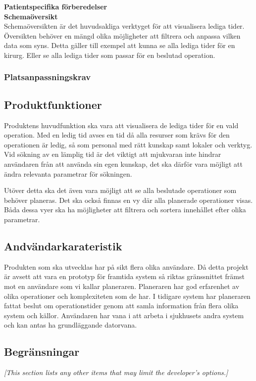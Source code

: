 \documentclass{article}
\begin{document}
\begin{enumerate}
\textbf{Patientspecifika förberedelser}\\
\textbf{Schemaöversikt}\\
Schemaöversikten är det huvudsakliga verktyget för att visualisera lediga tider.
Översikten behöver en mängd olika möjligheter att filtrera och anpassa vilken
data som syns. Detta gäller till exempel att kunna se alla lediga tider för en
kirurg. Eller se alla lediga tider som passar för en beslutad operation.\\


\subsubsection{Platsanpassningskrav}
\label{subsec:Platsanpassningskrav}
\subsection{Produktfunktioner}
\label{subsec:Produktfunktioner}
Produktens huvudfunktion ska vara att visualisera de lediga tider för en vald
operation. Med en ledig tid avses en tid då alla resurser som krävs för den
operationen är ledig, så som personal med rätt kunskap samt lokaler och verktyg.
Vid sökning av en lämplig tid är det viktigt att mjukvaran inte hindrar
användaren från att använda sin egen kunskap, det ska därför vara möjligt att
ändra relevanta parametrar för sökningen.

Utöver detta ska det även vara möjligt att se alla beslutade operationer som
behöver planeras. Det ska också finnas en vy där alla planerade operationer
visas. Båda dessa vyer ska ha möjligheter att filtrera och sortera innehållet
efter olika parametrar.
\subsection{Andvändarkarateristik}
\label{subsec:Andvandarkarateristik}
Produkten som ska utvecklas har på sikt flera olika användare. Då detta
projekt är avsett att vara en prototyp för framtida system så riktas gränssnittet
främst mot en användare som vi kallar planeraren. Planeraren har god
erfarenhet av olika operationer och komplexiteten som de har. I tidigare system
har planeraren fattat beslut om operationstider genom att samla information
från flera olika system och källor. Användaren har vana i att arbeta i sjukhusets
andra system och kan antas ha grundläggande datorvana.

\subsection{Begränsningar}
\label{subsec:Begransningar}
\emph{[This section lists any other items that may limit the developer's
  options.]}


\end{enumerate}
\end{document}
